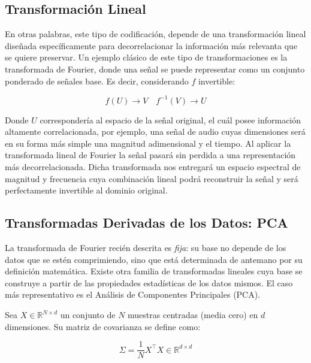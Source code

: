     
    \subsection{Transformación Lineal}
        En otras palabras, este tipo de codificación, depende de una transformación lineal diseñada específicamente para decorrelacionar la información más relevanta que se quiere preservar\cite{goyal2001theoretical}. Un ejemplo clásico de este tipo de transformaciones es la transformada de Fourier, donde una señal se puede representar como un conjunto ponderado de señales base. Es decir, considerando $f$ invertible:
    
        \begin{equation}
            f(U) \longrightarrow V \quad f^{-1}(V) \longrightarrow U
        \end{equation}
    
        Donde $U$ correspondería al espacio de la señal original, el cuál posee información altamente correlacionada, por ejemplo, una señal de audio cuyas dimensiones será en su forma más simple una magnitud adimensional y el tiempo. Al aplicar la transformada lineal de Fourier la señal pasará sin perdida a una representación más decorrelacionada. Dicha transformada nos entregará un espacio espectral de magnitud y frecuencia cuya combinación lineal podrá reconstruir la señal y será perfectamente invertible al dominio original.\\

    \subsection{Transformadas Derivadas de los Datos: PCA}
        La transformada de Fourier recién descrita es \textit{fija}: su base no depende de los datos que se estén comprimiendo, sino que está determinada de antemano por su definición matemática. Existe otra familia de transformadas lineales cuya base se construye a partir de las propiedades estadísticas de los datos mismos. El caso más representativo es el Análisis de Componentes Principales (PCA).

        Sea $X \in \mathbb{R}^{N \times d}$ un conjunto de $N$ muestras centradas (media cero) en $d$ dimensiones. Su matriz de covarianza se define como:

        \begin{equation}
            \Sigma = \frac{1}{N} X^\top X \in \mathbb{R}^{d \times d}
        \end{equation}

